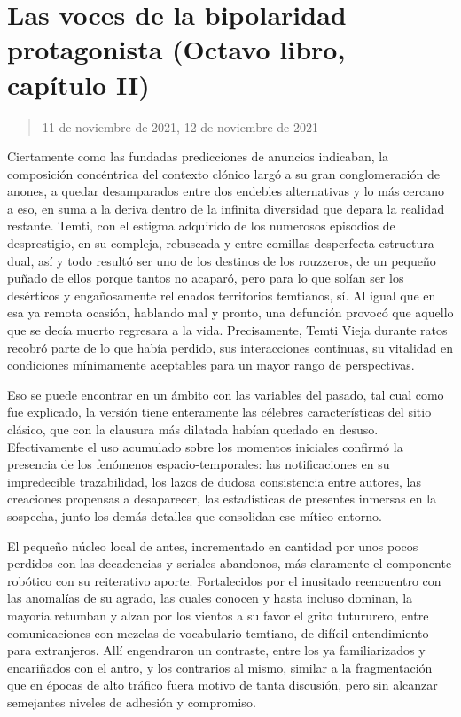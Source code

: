 \documentclass[
]{book}
\begin{document}
\hypertarget{las-voces-de-la-bipolaridad-protagonista-octavo-libro-capuxedtulo-ii}{%
\section{Las voces de la bipolaridad protagonista (Octavo libro, capítulo II)}\label{las-voces-de-la-bipolaridad-protagonista-octavo-libro-capuxedtulo-ii}}

\begin{quote}
11 de noviembre de 2021, 12 de noviembre de 2021
\end{quote}

Ciertamente como las fundadas predicciones de anuncios indicaban, la composición concéntrica del contexto clónico largó a su gran conglomeración de anones, a quedar desamparados entre dos endebles alternativas y lo más cercano a eso, en suma a la deriva dentro de la infinita diversidad que depara la realidad restante. Temti, con el estigma adquirido de los numerosos episodios de desprestigio, en su compleja, rebuscada y entre comillas desperfecta estructura dual, así y todo resultó ser uno de los destinos de los rouzzeros, de un pequeño puñado de ellos porque tantos no acaparó, pero para lo que solían ser los desérticos y engañosamente rellenados territorios temtianos, sí. Al igual que en esa ya remota ocasión, hablando mal y pronto, una defunción provocó que aquello que se decía muerto regresara a la vida. Precisamente, Temti Vieja durante ratos recobró parte de lo que había perdido, sus interacciones continuas, su vitalidad en condiciones mínimamente aceptables para un mayor rango de perspectivas.

Eso se puede encontrar en un ámbito con las variables del pasado, tal cual como fue explicado, la versión tiene enteramente las célebres características del sitio clásico, que con la clausura más dilatada habían quedado en desuso. Efectivamente el uso acumulado sobre los momentos iniciales confirmó la presencia de los fenómenos espacio-temporales: las notificaciones en su impredecible trazabilidad, los lazos de dudosa consistencia entre autores, las creaciones propensas a desaparecer, las estadísticas de presentes inmersas en la sospecha, junto los demás detalles que consolidan ese mítico entorno.

El pequeño núcleo local de antes, incrementado en cantidad por unos pocos perdidos con las decadencias y seriales abandonos, más claramente el componente robótico con su reiterativo aporte. Fortalecidos por el inusitado reencuentro con las anomalías de su agrado, las cuales conocen y hasta incluso dominan, la mayoría retumban y alzan por los vientos a su favor el grito tutururero, entre comunicaciones con mezclas de vocabulario temtiano, de difícil entendimiento para extranjeros. Allí engendraron un contraste, entre los ya familiarizados y encariñados con el antro, y los contrarios al mismo, similar a la fragmentación que en épocas de alto tráfico fuera motivo de tanta discusión, pero sin alcanzar semejantes niveles de adhesión y compromiso.
\end{document}
